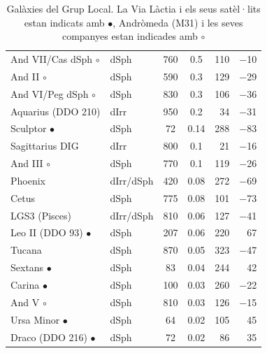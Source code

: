 \begin{table}[ht]
\begin{tabular}{l l c c r r}
		And VII/Cas dSph $\circ$  & dSph & \num{760} & \num{0.5} & \num{110} &  \num{-10} \\
		And II $\circ$            & dSph & \num{590} & \num{0.3} & \num{129} &  \num{-29} \\
		And VI/Peg dSph $\circ$   & dSph & \num{830} & \num{0.3} & \num{106} &  \num{-36} \\
		Aquarius (DDO 210)        & dIrr & \num{950} & \num{0.2} & \num{34} &  \num{-31} \\
		Sculptor $\bullet$        & dSph & \num{72} & \num{0.14} & \num{288} &  \num{-83} \\
		Sagittarius DIG           & dIrr & \num{800} & \num{0.1} & \num{21} &  \num{-16} \\
		And III $\circ$           & dSph      & \num{770} & \num{0.1} & \num{119} &  \num{-26} \\
		Phoenix                   & dIrr/dSph & \num{420} & \num{0.08} & \num{272} &  \num{-69} \\
		Cetus                     & dSph      & \num{775} & \num{0.08} & \num{101} &  \num{-73} \\
		LGS3 (Pisces)             & dIrr/dSph & \num{810} & \num{0.06} & \num{127} &  \num{-41} \\
		Leo II (DDO 93) $\bullet$ & dSph      & \num{207} & \num{0.06} & \num{220} &  \num{67} \\
		Tucana                    & dSph & \num{870} & \num{0.05} & \num{323} &  \num{-47} \\
		Sextans $\bullet$         & dSph & \num{83} & \num{0.04} & \num{244} &  \num{42} \\
		Carina $\bullet$          & dSph & \num{100} & \num{0.03} & \num{260} &  \num{-22} \\
		And V $\circ$             & dSph & \num{810} & \num{0.03} & \num{126} &  \num{-15} \\
		Ursa Minor $\bullet$      & dSph & \num{64} & \num{0.02} & \num{105} &  \num{45} \\
		Draco (DDO 216) $\bullet$ & dSph & \num{72} & \num{0.02} & \num{86} &  \num{35} \\
		\bottomrule
	\end{tabular}
	\caption{Galàxies del Grup Local. La Via Làctia i els seus satèl·lits estan indicats amb $\bullet$, Andròmeda (M31) i les seves companyes estan indicades amb $\circ$}
	\label{tab:grup-local}
\end{table}
